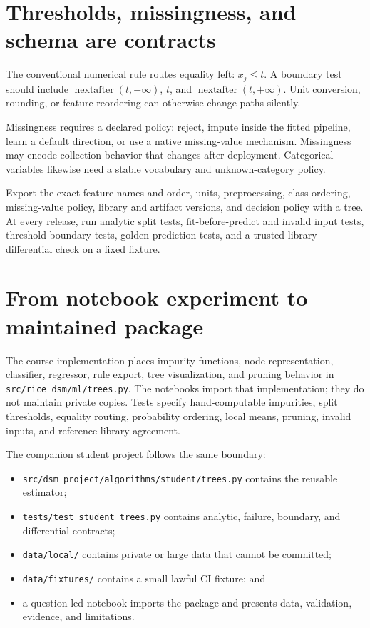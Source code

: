 \section{Thresholds, missingness, and schema are contracts}

The conventional numerical rule routes equality left:
$x_j\le t$. A boundary test should include
$\operatorname{nextafter}(t,-\infty)$, $t$, and
$\operatorname{nextafter}(t,+\infty)$. Unit conversion, rounding, or feature
reordering can otherwise change paths silently.

Missingness requires a declared policy: reject, impute inside the fitted
pipeline, learn a default direction, or use a native missing-value mechanism.
Missingness may encode collection behavior that changes after deployment.
Categorical variables likewise need a stable vocabulary and unknown-category
policy.

\begin{professionalbox}
Export the exact feature names and order, units, preprocessing, class ordering,
missing-value policy, library and artifact versions, and decision policy with a
tree. At every release, run analytic split tests, fit-before-predict and invalid
input tests, threshold boundary tests, golden prediction tests, and a
trusted-library differential check on a fixed fixture.
\end{professionalbox}

\section{From notebook experiment to maintained package}

The course implementation places impurity functions, node representation,
classifier, regressor, rule export, tree visualization, and pruning behavior in
\texttt{src/rice\_dsm/ml/trees.py}. The notebooks import that implementation;
they do not maintain private copies. Tests specify hand-computable impurities,
split thresholds, equality routing, probability ordering, local means, pruning,
invalid inputs, and reference-library agreement.

The companion student project follows the same boundary:
\begin{itemize}
  \item \texttt{src/dsm\_project/algorithms/student/trees.py} contains the
  reusable estimator;
  \item \texttt{tests/test\_student\_trees.py} contains analytic, failure,
  boundary, and differential contracts;
  \item \texttt{data/local/} contains private or large data that cannot be
  committed;
  \item \texttt{data/fixtures/} contains a small lawful CI fixture; and
  \item a question-led notebook imports the package and presents data,
  validation, evidence, and limitations.
\end{itemize}

